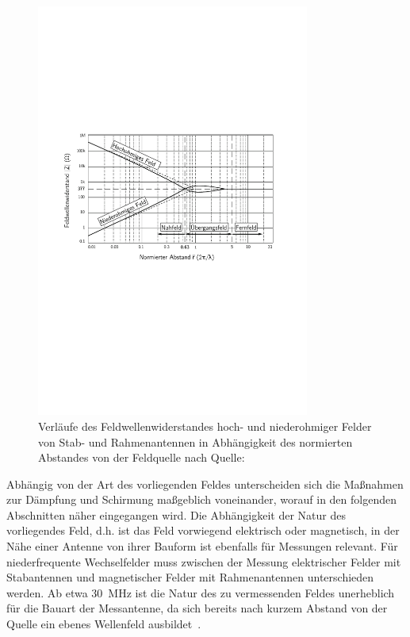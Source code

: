 \begin{figure}[ht]
    \centering
    \includegraphics[page=1, width=0.8\textwidth, trim = 1.3cm 8.5cm 1.5cm 7cm, clip]{Abbildungen/Kapitel2/Feldwellenwiderstand.pdf}
    \caption{Verläufe des Feldwellenwiderstandes hoch- und niederohmiger Felder von Stab- und Rahmenantennen in Abhängigkeit des normierten Abstandes von der Feldquelle nach Quelle:~\cite{EMV}}
    \label{fig:2_Feldwellenwiderstand}
\end{figure}


Abhängig von der Art des vorliegenden Feldes unterscheiden sich die Maßnahmen zur Dämpfung und Schirmung maßgeblich voneinander, worauf in den folgenden Abschnitten näher eingegangen wird. Die Abhängigkeit der Natur des vorliegendes Feld, d.h. ist das Feld vorwiegend elektrisch oder magnetisch, in der Nähe einer Antenne von ihrer Bauform ist ebenfalls für Messungen relevant. Für niederfrequente Wechselfelder muss zwischen der Messung elektrischer Felder mit Stabantennen und magnetischer Felder mit Rahmenantennen unterschieden werden. Ab etwa \SI{30}{\mega\hertz} ist die Natur des zu vermessenden Feldes unerheblich für die Bauart der Messantenne, da sich bereits nach kurzem Abstand von der Quelle ein ebenes Wellenfeld ausbildet~\cite{Design_of_shielded_enclosures}.



